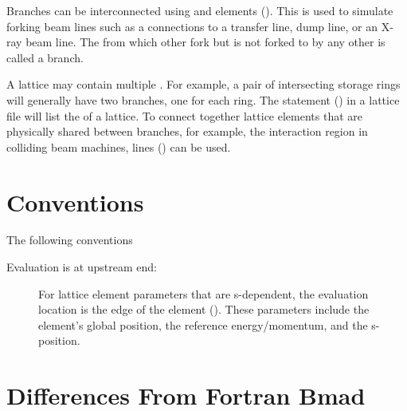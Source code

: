 Branches can be interconnected using  and  elements (). This
is used to simulate forking beam lines such as a connections to a transfer line, dump line, or an
X-ray beam line. The  from which other  fork but is not forked to by any
other  is called a  branch.

A lattice may contain multiple  . For example, a pair of intersecting storage
rings will generally have two  branches, one for each ring. The  statement
() in a lattice file will list the   of a lattice. To connect
together lattice elements that are physically shared between branches, for example, the interaction
region in colliding beam machines,  lines () can be used.

\section{Conventions}
\label{s:conventions}

The following conventions 
\begin{description}
%
\item[Evaluation is at upstream end:] 
For lattice element parameters that are s-dependent, the evaluation location is the
 edge of the element (). These parameters include the 
element's global position, the reference energy/momentum, and the s-position.
%
\end{description}


\section{Differences From Fortran Bmad}

